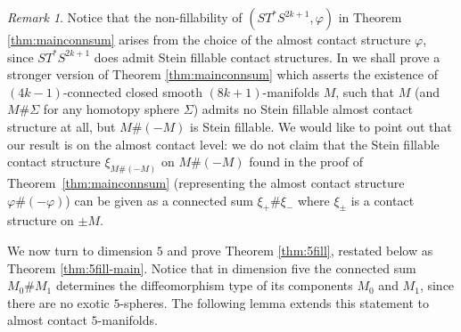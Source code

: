 \documentclass[12pt]{amsart}
\newcommand\acs{\varphi}  				%
\newtheorem{Lemma}[Theorem]{Lemma}
\theoremstyle{remark}
\newtheorem{Remark}[Theorem]{Remark}
\begin{document}


\begin{Remark}
Notice that the non{-}fillability of $(ST^*S^{2k{+}1}, \acs)$ in Theorem
\ref{thm:mainconnsum} arises from the choice of the almost contact
structure $\acs$, since $ST^*S^{2k{+}1}$ does admit Stein fillable
contact structures.  In \cite{BCS3} we shall prove a stronger version
of Theorem \ref{thm:mainconnsum} which asserts the existence of
$(4k{-}1)$-connected closed smooth $(8k{+}1)$-manifolds $M$, such that $M$
(and $M\# \Sigma$ for any homotopy sphere $\Sigma$)
admits no Stein fillable almost contact structure at all, but $M \# (-M)$ is 
Stein fillable.
We would like to point out that our result is on the almost contact level:
we do not claim that the Stein fillable contact structure $\xi _{M\# (-M)}$ on $M\# (-M)$ 
found in the proof of Theorem~\ref{thm:mainconnsum}
(representing the almost contact structure $\varphi \# (-\varphi )$) 
can be given
as a connected sum 
$\xi _+\# \xi _-$ where $\xi _{\pm}$ is a contact structure on $\pm M$. 
\end{Remark}


We now turn to dimension $5$ and prove Theorem \ref{thm:5fill},
restated below as Theorem \ref{thm:5fill-main}.
Notice that in 
dimension five the connected sum $M_0\# M_1$ determines the diffeomorphism 
type of its components $M_0$ and $M_1$, since there are no exotic $5$-spheres.
The following lemma extends this statement to almost contact $5$-manifolds.
\end{document}
